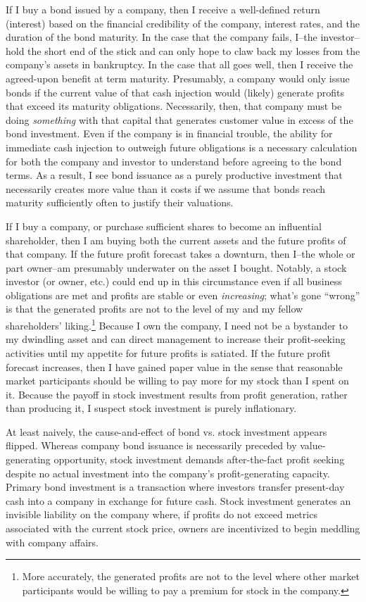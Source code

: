 If I buy a bond issued by a company, then I receive a well-defined return (interest) based on the financial credibility of the company, interest rates, and the duration of the bond maturity.  In the case that the company fails, I--the investor--hold the short end of the stick and can only hope to claw back my losses from the company's assets in bankruptcy.  In the case that all goes well, then I receive the agreed-upon benefit at term maturity.  Presumably, a company would only issue bonds if the current value of that cash injection would (likely) generate profits that exceed its maturity obligations.  Necessarily, then, that company must be doing {\it something} with that capital that generates customer value in excess of the bond investment.  Even if the company is in financial trouble, the ability for immediate cash injection to outweigh future obligations is a necessary calculation for both the company and investor to understand before agreeing to the bond terms.  As a result, I see bond issuance as a purely productive investment that necessarily creates more value than it costs if we assume that bonds reach maturity sufficiently often to justify their valuations.  

If I buy a company, or purchase sufficient shares to become an influential shareholder, then I am buying both the current assets and the future profits of that company.  If the future profit forecast takes a downturn, then I--the whole or part owner--am presumably underwater on the asset I bought.  Notably, a stock investor (or owner, etc.) could end up in this circumstance even if all business obligations are met and profits are stable or even {\it increasing}; what's gone ``wrong'' is that the generated profits are not to the level of my and my fellow shareholders' liking.\footnote{More accurately, the generated profits are not to the level where other market participants would be willing to pay a premium for stock in the company.}  Because I own the company, I need not be a bystander to my dwindling asset and can direct management to increase their profit-seeking activities until my appetite for future profits is satiated.  If the future profit forecast increases, then I have gained paper value in the sense that reasonable market participants should be willing to pay more for my stock than I spent on it.  Because the payoff in stock investment results from profit generation, rather than producing it, I suspect stock investment is purely inflationary.

At least naively, the cause-and-effect of bond vs. stock investment appears flipped.  
Whereas company bond issuance is necessarily preceded by value-generating opportunity, stock investment demands after-the-fact profit seeking despite no actual investment into the company's profit-generating capacity.  Primary bond investment is a transaction where investors transfer present-day cash into a company in exchange for future cash.  Stock investment generates an invisible liability on the company where, if profits do not exceed metrics associated with the current stock price, owners are incentivized to begin meddling with company affairs.

